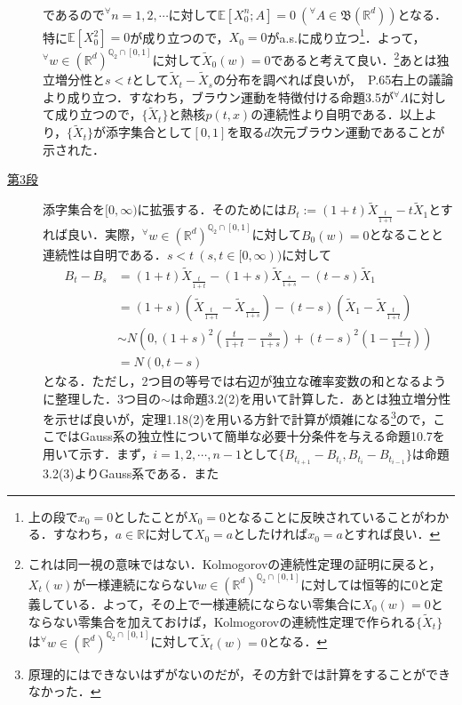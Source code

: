 \documentclass[dvipdfmx]{jsarticle}
\begin{document}
\begin{description}
\begin{align*}
\end{align*}
であるので$^\forall n=1,2,\cdots$に対して$\mathbb{E}[X_0^n;A]=0{\ }( ^\forall A\in\mathfrak{B}(\mathbb{R}^d))$となる．特に$\mathbb{E}[X_0^2]=0$が成り立つので，$X_0=0$がa.s.に成り立つ\footnote{上の段で$x_0=0$としたことが$X_0=0$となることに反映されていることがわかる．すなわち，$a\in\mathbb{R}$に対して$X_0=a$としたければ$x_0=a$とすれば良い．}．よって，$^\forall w\in (\mathbb{R}^d)^{\mathbb{Q}_2\cap [0,1]}$に対して$\widetilde{X}_0(w)=0$であると考えて良い．\footnote{これは同一視の意味ではない．Kolmogorovの連続性定理の証明に戻ると，$X_t(w)$が一様連続にならない$w\in (\mathbb{R}^d)^{\mathbb{Q}_2\cap [0,1]}$に対しては恒等的に0と定義している．よって，その上で一様連続にならない零集合に$X_0(w)=0$とならない零集合を加えておけば，Kolmogorovの連続性定理で作られる$\{\widetilde{X}_t\}$は$^\forall w\in (\mathbb{R}^d)^{\mathbb{Q}_2\cap [0,1]}$に対して$\widetilde{X}_t(w)=0$となる．}あとは独立増分性と$s<t$として$\widetilde{X}_t-\widetilde{X}_s$の分布を調べれば良いが，\cite{taniguchi}{\ }P.65右上の議論より成り立つ．すなわち，ブラウン運動を特徴付ける\cite{taniguchi}命題3.5が$^\forall \Lambda$に対して成り立つので，$\{\widetilde{X}_t\}$と熱核$p(t,x)$の連続性より自明である．以上より，$\{\widetilde{X}_t\}$が添字集合として$[0,1]$を取る$d$次元ブラウン運動であることが示された．
\item[\underline{第3段}]
添字集合を$[0,\infty)$に拡張する．そのためには$B_t:=(1+t)\widetilde{X}_{\frac{t}{1+t}}-t\widetilde{X}_1$とすれば良い．実際，$^\forall w\in (\mathbb{R}^d)^{\mathbb{Q}_2\cap [0,1]}$に対して$B_0(w)=0$となることと連続性は自明である．$s<t{\ }(s,t\in [0,\infty))$に対して
\begin{align*}
B_t-B_s
&=(1+t)\widetilde{X}_{\frac{t}{1+t}}-(1+s)\widetilde{X}_{\frac{s}{1+s}}-(t-s)\widetilde{X}_1 \\
&=(1+s)(\widetilde{X}_{\frac{t}{1+t}}-\widetilde{X}_{\frac{s}{1+s}})-(t-s)(\widetilde{X}_1-\widetilde{X}_{\frac{t}{1+t}}) \\
&\sim N\left(0,(1+s)^2\left(\frac{t}{1+t}-\frac{s}{1+s}\right)+(t-s)^2\left(1-\frac{t}{1-t}\right)\right) \\
&=N(0,t-s)
\end{align*}
となる．ただし，2つ目の等号では右辺が独立な確率変数の和となるように整理した．3つ目の$\sim$は\cite{taniguchi}命題3.2(2)を用いて計算した．あとは独立増分性を示せば良いが，\cite{taniguchi}定理1.18(2)を用いる方針で計算が煩雑になる\footnote{原理的にはできないはずがないのだが，その方針では計算をすることができなかった．}ので，ここではGauss系の独立性について簡単な必要十分条件を与える\cite{kotani}命題10.7を用いて示す．まず，$i=1,2,\cdots,n-1$として$\{B_{t_{i+1}}-B_{t_i},B_{t_i}-B_{t_{i-1}}\}$は\cite{taniguchi}命題3.2(3)よりGauss系である．また

\end{description}
\end{document}
